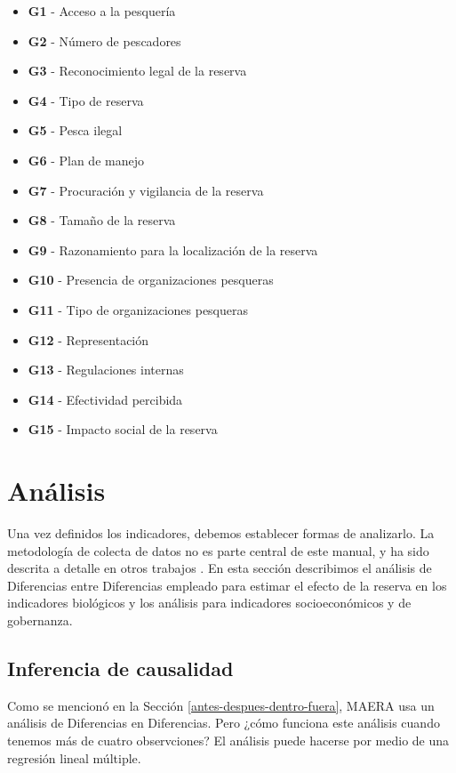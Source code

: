 \documentclass[]{krantz}
\providecommand{\tightlist}{%
  \setlength{\itemsep}{0pt}\setlength{\parskip}{0pt}}
\begin{document}
\begin{itemize}
\tightlist
\item
  \textbf{G1} - Acceso a la pesquería
\item
  \textbf{G2} - Número de pescadores
\item
  \textbf{G3} - Reconocimiento legal de la reserva
\item
  \textbf{G4} - Tipo de reserva
\item
  \textbf{G5} - Pesca ilegal
\item
  \textbf{G6} - Plan de manejo
\item
  \textbf{G7} - Procuración y vigilancia de la reserva
\item
  \textbf{G8} - Tamaño de la reserva
\item
  \textbf{G9} - Razonamiento para la localización de la reserva
\item
  \textbf{G10} - Presencia de organizaciones pesqueras
\item
  \textbf{G11} - Tipo de organizaciones pesqueras
\item
  \textbf{G12} - Representación
\item
  \textbf{G13} - Regulaciones internas
\item
  \textbf{G14} - Efectividad percibida
\item
  \textbf{G15} - Impacto social de la reserva
\end{itemize}

\hypertarget{analisis}{%
\section{Análisis}\label{analisis}}

Una vez definidos los indicadores, debemos establecer formas de
analizarlo. La metodología de colecta de datos no es parte central de
este manual, y ha sido descrita a detalle en otros trabajos
\citep{suman_2010, villaseorderbez_2017, villasenorderbez_2018}. En esta
sección describimos el análisis de Diferencias entre Diferencias
empleado para estimar el efecto de la reserva en los indicadores
biológicos y los análisis para indicadores socioeconómicos y de
gobernanza.

\hypertarget{inferencia-de-causalidad}{%
\subsection{Inferencia de causalidad}\label{inferencia-de-causalidad}}

Como se mencionó en la Sección \ref{antes-despues-dentro-fuera}, MAERA
usa un análisis de Diferencias en Diferencias. Pero ¿cómo funciona este
análisis cuando tenemos más de cuatro observciones? El análisis puede
hacerse por medio de una regresión lineal múltiple.
\end{document}
